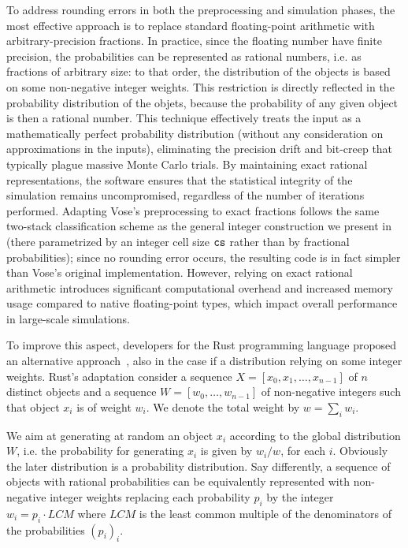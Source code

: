 To address rounding errors in both the preprocessing and simulation phases, the most effective approach
is to replace standard floating-point arithmetic with arbitrary-precision fractions.
In practice, since the floating number have finite precision, the probabilities can be represented as rational numbers, i.e. as fractions of arbitrary size:
to that order, the distribution of the objects is based on some non-negative integer weights. This restriction is directly reflected in the probability distribution of the objets, because the probability of any given object is then a rational number. 
This technique effectively treats the input as a mathematically perfect probability distribution
(without any consideration on approximations in the inputs), eliminating the precision drift and 
bit-creep that typically plague massive Monte Carlo trials. By maintaining exact rational representations,
the software ensures that the statistical integrity of the simulation remains uncompromised, 
regardless of the number of iterations performed.
Adapting Vose's preprocessing to exact fractions follows the same two-stack classification scheme as
the general integer construction we present in~ (there parametrized by an integer cell
size $\texttt{cs}$ rather than by fractional probabilities); since no rounding error occurs, the resulting code
is in fact simpler than Vose's original implementation.
However, relying on exact rational arithmetic introduces significant computational overhead and
increased memory usage compared to native floating-point types, which impact
overall performance in large-scale simulations.

To improve this aspect, developers for the Rust programming language proposed 
an alternative approach~\cite{Rust25}, also in the case
if a distribution relying on some integer weights.
Rust's adaptation consider a sequence $X = [x_0, x_1, \dots, x_{n-1}]$ of $n$ distinct objects and a sequence 
$W =[w_0, \dots, w_{n-1}]$ of non-negative integers such that object $x_i$ is of weight $w_i$. 
We denote the total weight by $w = \sum_i w_i$.

We aim at generating at random an object $x_i$
according to the global distribution $W$, i.e. the probability for generating $x_i$ is given 
by $w_i / w$, for each $i$. Obviously the later distribution is a probability distribution.
Say differently, a sequence of objects with rational probabilities can be equivalently represented with non-negative integer weights
replacing each probability $p_i$ by the integer $w_i = p_i \cdot LCM$ where $LCM$ is the least common multiple of the denominators 
of the probabilities $(p_i)_i$.

